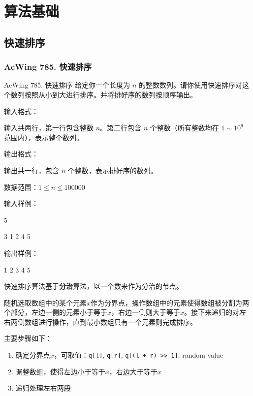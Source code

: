 \chapter{算法基础}

\section{快速排序}
\subsection{AcWing 785. 快速排序}

\begin{titledbox}{AcWing 785. 快速排序}
  给定你一个长度为 $n$ 的整数数列。请你使用快速排序对这个数列按照从小到大进行排序。并将排好序的数列按顺序输出。

  输入格式：

  输入共两行，第一行包含整数 $n$。第二行包含 $n$ 个整数（所有整数均在 $1 \sim 10^9$ 范围内），表示整个数列。

  输出格式：

  输出共一行，包含 $n$ 个整数，表示排好序的数列。

  数据范围：$1 \le n \le 100000$

  输入样例：

  5

  3 1 2 4 5

  输出样例：

  1 2 3 4 5
\end{titledbox}

快速排序算法基于\textbf{分治}算法，以一个数来作为分治的节点。

随机选取数组中的某个元素$x$作为分界点，操作数组中的元素使得数组被分割为两个部分，左边一侧的元素小于等于$x$，右边一侧则大于等于$x$。接下来递归的对左右两侧数组进行操作，直到最小数组只有一个元素则完成排序。

主要步骤如下：
\begin{enumerate}
  \item 确定分界点$x$，可取值：\lstinline{q[l]}, \lstinline{q[r]}, \lstinline{q[(l + r) >> 1]}, random value
  \item 调整数组，使得左边小于等于$x$，右边大于等于$x$
  \item 递归处理左右两段
\end{enumerate}

